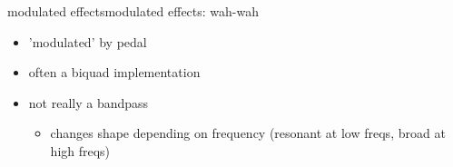 \begin{frame}{modulated effects}{modulated effects: wah-wah}
\begin{figure}[!hbt]
\begin{center}
\begin{picture}
	            \end{picture}
				\end{center}
	        \end{figure}
            \begin{itemize}
                \item   'modulated' by pedal
                \item   often a biquad implementation
                \item   not really a bandpass 
                    \begin{itemize}
                        \item changes shape depending on frequency (resonant at low freqs, broad at high freqs)
                    \end{itemize}
            \end{itemize}
\end{frame}

